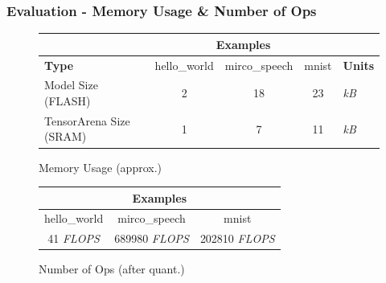 \documentclass{tum-presentation}
\begin{document}
\begin{frame}
  \frametitle{Evaluation - Memory Usage \& Number of Ops}

\begin{figure}[h]
     \centering
  \begin{table}[h]
\begin{tabular}{|l|c|c|c|l|}
\hline
& \multicolumn{3}{c|}{\textbf{Examples}} &\\\hline
\textbf{Type}                        & hello\_world & mirco\_speech & mnist & \textbf{Units} \\\hline
Model Size (FLASH)                      & 2              & 18              & 23      & \textit{kB}     \\
TensorArena Size (SRAM) & 1              & 7               & 11      & \textit{kB}\\\hline  
\end{tabular}
\end{table}
 \caption{Memory Usage (approx.)}
\end{figure}

\begin{figure}[h]
     \centering
\begin{table}[h]
\begin{tabular}{|c|c|c|}
\hline
\multicolumn{3}{|c|}{\textbf{Examples}}\\\hline
hello\_world & mirco\_speech & mnist        \\\hline
41 \textit{FLOPS}     & 689980 \textit{FLOPS}  & 202810 \textit{FLOPS}\\\hline
\end{tabular}
\end{table}
 \caption{Number of Ops (after quant.)}
\end{figure}

\end{frame}
\end{document}

